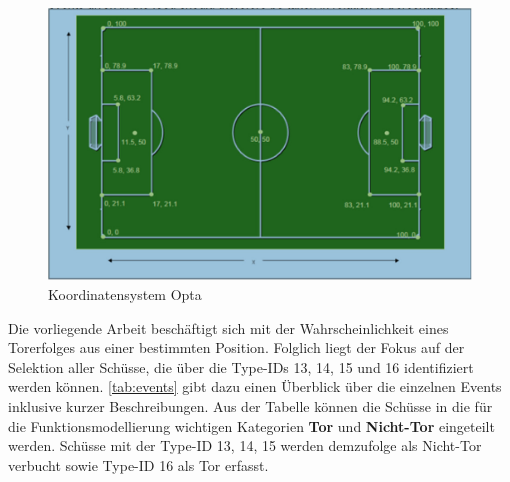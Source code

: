 \begin{figure}[H]
\centering
\includegraphics[scale=0.4]{se-wa-jpg/opta_pitch}
\caption[Koordinatensystem Opta]{Koordinatensystem Opta\protect\footnotemark}
\label{opta_pitch}
\end{figure}

Die vorliegende Arbeit beschäftigt sich mit der Wahrscheinlichkeit eines Torerfolges aus einer bestimmten Position. Folglich liegt der Fokus auf der Selektion aller Schüsse, die über die Type-IDs \textsf{13, 14, 15} und \textsf{16} identifiziert werden können. \vref{tab:events} gibt dazu einen Überblick über die einzelnen Events inklusive kurzer Beschreibungen. Aus der Tabelle können die Schüsse in die für die Funktionsmodellierung wichtigen Kategorien \textbf{Tor} und \textbf{Nicht-Tor} eingeteilt werden. Schüsse mit der Type-ID \textsf{13, 14, 15} werden demzufolge als Nicht-Tor verbucht sowie Type-ID \textsf{16} als Tor erfasst.

